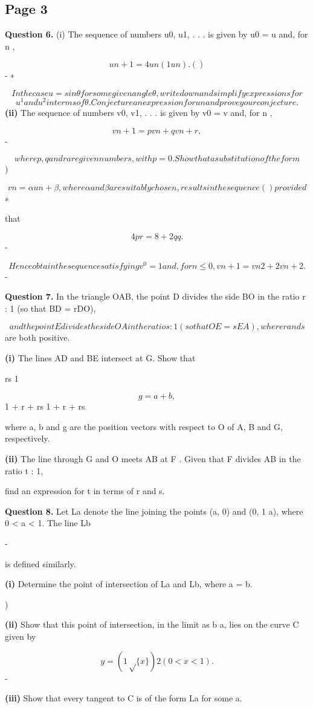 \documentclass[12pt]{article}
\begin{document}
\subsection*{Page 3}
\begin{flushleft}
\bigskip\textbf{Question 6.} (i) The sequence of numbers u0, u1, . . . is given by u0 = u and, for n ,\par
\[un+1 = 4un(1 un) . ( )\]
- ∗\par
\[In the case u = sin θ for some given angle θ, write down and simplify expressions for\]
\[u^1 and u^2 in terms of θ. Conjecture an expression for un and prove your conjecture.\]
\textbf{(ii)} The sequence of numbers v0, v1, . . . is given by v0 = v and, for n ,\par
\[vn+1 = pvn + qvn + r ,\]
-\par
\[where p, q and r are given numbers, with p = 0. Show that a substitution of the form\]
)\par
\[vn = αun + β, where α and β are suitably chosen, results in the sequence ( ) provided\]
∗\par
that\par
\[4pr = 8 + 2q q .\]
-\par
\[Hence obtain the sequence satisfying v^0 = 1 and, for n \leq 0, vn+1 = vn 2 + 2vn + 2 .\]
-\par
\bigskip\textbf{Question 7.} In the triangle OAB, the point D divides the side BO in the ratio r : 1 (so that BD = rDO),\par
\[and the point E divides the side OA in the ratio s : 1 (so that OE = sEA), where r and s\]
are both positive.\par
\textbf{(i)} The lines AD and BE intersect at G. Show that\par
rs 1\par
\[g = a + b ,\]
1 + r + rs 1 + r + rs\par
where a, b and g are the position vectors with respect to O of A, B and G, respectively.\par
\textbf{(ii)} The line through G and O meets AB at F . Given that F divides AB in the ratio t : 1,\par
find an expression for t in terms of r and s.\par
\bigskip\textbf{Question 8.} Let La denote the line joining the points (a, 0) and (0, 1 a), where 0 < a < 1. The line Lb\par
-\par
is defined similarly.\par
\textbf{(i)} Determine the point of intersection of La and Lb, where a = b.\par
)\par
\textbf{(ii)} Show that this point of intersection, in the limit as b a, lies on the curve C given by\par
\to\par
\[y = (1 \sqrt\{x\}) 2 (0 < x < 1) .\]
-\par
\textbf{(iii)} Show that every tangent to C is of the form La for some a.\par
\end{flushleft}
\end{document}
